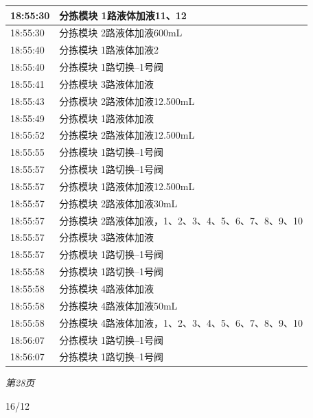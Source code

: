 \documentclass[UTF8,10pt,a4paper,fontset=fandol]{ctexart}
\newcommand{\handwritten}[1]{#1}
\begin{document}
\begin{center}
\begin{minipage}[t]{0.47\linewidth}
\smallskip
\scriptsize
\begin{tabular}{|p{1.25cm}|p{5.35cm}|}
\hline
18:55:30 & 分拣模块 1路液体加液11、12 \\
\hline
18:55:30 & 分拣模块 2路液体加液600mL \\
\hline
18:55:40 & 分拣模块 1路液体加液2 \\
\hline
18:55:40 & 分拣模块 1路切换--1号阀 \\
\hline
18:55:41 & 分拣模块 3路液体加液 \\
\hline
18:55:43 & 分拣模块 2路液体加液12.500mL \\
\hline
18:55:49 & 分拣模块 1路液体加液 \\
\hline
18:55:52 & 分拣模块 2路液体加液12.500mL \\
\hline
18:55:55 & 分拣模块 1路切换--1号阀 \\
\hline
18:55:57 & 分拣模块 1路切换--1号阀 \\
\hline
18:55:57 & 分拣模块 1路液体加液12.500mL \\
\hline
18:55:57 & 分拣模块 2路液体加液30mL \\
\hline
18:55:57 & 分拣模块 2路液体加液，1、2、3、4、5、6、7、8、9、10 \\
\hline
18:55:57 & 分拣模块 3路液体加液 \\
\hline
18:55:57 & 分拣模块 1路切换--1号阀 \\
\hline
18:55:58 & 分拣模块 1路切换--1号阀 \\
\hline
18:55:58 & 分拣模块 4路液体加液 \\
\hline
18:55:58 & 分拣模块 4路液体加液50mL \\
\hline
18:55:58 & 分拣模块 4路液体加液，1、2、3、4、5、6、7、8、9、10 \\
\hline
18:56:07 & 分拣模块 1路切换--1号阀 \\
\hline
18:56:07 & 分拣模块 1路切换--1号阀 \\
\hline
\end{tabular}

\smallskip
\textit{第28页}
\end{minipage}
\end{center}

\handwritten{16/12}

\newpage
\end{document}

